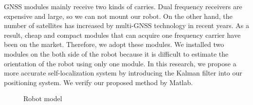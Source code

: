 \documentclass[a4paper]{article}
\begin{document}
GNSS modules mainly receive two kinds of carries.
Dual frequency receivers are expensive and large, so we can not mount our robot.
On the other hand, the number of satellites has increased by multi-GNSS technology in recent years. 
As a result, cheap and compact modules that can acquire one frequency carrier have been on the market.
Therefore, we adopt these modules.
We installed two modules on the both side of the robot because it is difficult to estimate the orientation of the robot using only one module.
In this research, we propose a more accurate self-localization system by introducing the Kalman filter into our positioning system.
We verify our proposed method by Matlab.

\begin{figure}[H]
    \vspace{5mm}
    \centerline{}
    \caption{Robot model}
\end{figure}
\end{document}
